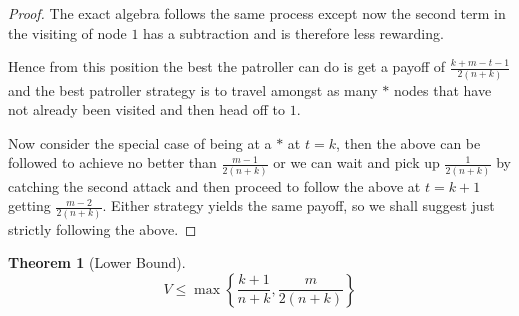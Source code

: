 \documentclass[a4paper,10pt]{article}
\newtheorem{theorem}{Theorem}[section]
\theoremstyle{definition}
\theoremstyle{definition}
\theoremstyle{remark}
\theoremstyle{definition}
\begin{document}
\begin{proof}
The exact algebra follows the same process except now the second term in the visiting of node $1$ has a subtraction and is therefore less rewarding. 

Hence from this position the best the patroller can do is get a payoff of $\frac{k+m-t-1}{2(n+k)}$ and the best patroller strategy is to travel amongst as many $*$ nodes that have not already been visited and then head off to $1$.

Now consider the special case of being at a $*$ at $t=k$, then the above can be followed to achieve no better than $\frac{m-1}{2(n+k)}$ or we can wait and pick up $\frac{1}{2(n+k)}$ by catching the second attack and then proceed to follow the above at $t=k+1$ getting $\frac{m-2}{2(n+k)}$. Either strategy yields the same payoff, so we shall suggest just strictly following the above.
\end{proof}

\begin{theorem}[Lower Bound]
$$V \leq \max \left\{ \frac{k+1}{n+k} , \frac{m}{2(n+k)} \right\}$$
\end{theorem}
\end{document}
